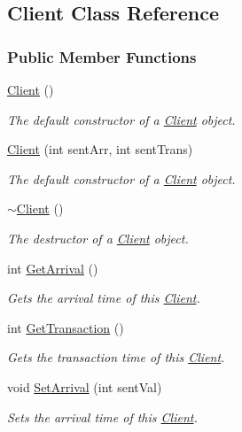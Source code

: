 \hypertarget{class_client}{}\subsection{Client Class Reference}
\label{class_client}
\subsubsection*{Public Member Functions}
\begin{DoxyCompactItemize}
\item 
\hyperlink{class_client_ae51af7aa6b8f591496a8f6a4a87a14bf}{Client} ()
\begin{DoxyCompactList}\small\item\em The default constructor of a \hyperlink{class_client}{Client} object. \end{DoxyCompactList}\item 
\hyperlink{class_client_a0fa23c7c7493b59c2119c354162d041b}{Client} (int sent\+Arr, int sent\+Trans)
\begin{DoxyCompactList}\small\item\em The default constructor of a \hyperlink{class_client}{Client} object. \end{DoxyCompactList}\item 
\hyperlink{class_client_a840e519ca781888cbd54181572ebe3a7}{$\sim$\+Client} ()
\begin{DoxyCompactList}\small\item\em The destructor of a \hyperlink{class_client}{Client} object. \end{DoxyCompactList}\item 
int \hyperlink{class_client_a676a47b0aefba4bf46618d7eb1d40e9b}{Get\+Arrival} ()
\begin{DoxyCompactList}\small\item\em Gets the arrival time of this \hyperlink{class_client}{Client}. \end{DoxyCompactList}\item 
int \hyperlink{class_client_a6ef866b5c85563698ddc3cdc5cc1f7c5}{Get\+Transaction} ()
\begin{DoxyCompactList}\small\item\em Gets the transaction time of this \hyperlink{class_client}{Client}. \end{DoxyCompactList}\item 
void \hyperlink{class_client_ab01109611c963a3835ebc8717f755bfa}{Set\+Arrival} (int sent\+Val)
\begin{DoxyCompactList}\small\item\em Sets the arrival time of this \hyperlink{class_client}{Client}. \end{DoxyCompactList}\item 

\end{DoxyCompactItemize}
